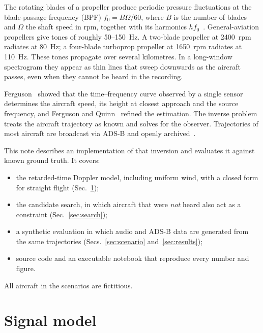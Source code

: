 \documentclass[10pt,twocolumn,letterpaper]{article}
\begin{document}
The rotating blades of a propeller produce periodic pressure fluctuations at the blade-passage frequency (BPF)
$f_0 = B\Omega/60$, where $B$ is the number of blades and $\Omega$ the shaft speed in rpm, together with its
harmonics $hf_0$~\cite{hubbard1991}. General-aviation propellers give tones of roughly 50--150~Hz. A two-blade
propeller at 2400~rpm radiates at 80~Hz; a four-blade turboprop propeller at 1650~rpm radiates at 110~Hz. These
tones propagate over several kilometres. In a long-window spectrogram they appear as thin lines that sweep
downwards as the aircraft passes, even when they cannot be heard in the recording.

Ferguson~\cite{ferguson1992} showed that the time--frequency curve observed by a single sensor determines the
aircraft speed, its height at closest approach and the source frequency, and Ferguson and Quinn~\cite{ferguson1994}
refined the estimation. The inverse problem treats the aircraft trajectory as known and solves for the observer.
Trajectories of most aircraft are broadcast via ADS-B and openly archived~\cite{adsblol}.

This note describes an implementation of that inversion and evaluates it against known ground truth. It covers:
\begin{itemize}
\item the retarded-time Doppler model, including uniform wind, with a closed form for straight flight
  (Sec.~\ref{sec:model});
\item the candidate search, in which aircraft that were \emph{not} heard also act as a constraint
  (Sec.~\ref{sec:search});
\item a synthetic evaluation in which audio and ADS-B data are generated from the same trajectories
  (Secs.~\ref{sec:scenario} and~\ref{sec:results});
\item source code and an executable notebook that reproduce every number and figure.
\end{itemize}
All aircraft in the scenarios are fictitious.

\section{Signal model}\label{sec:model}
\end{document}
